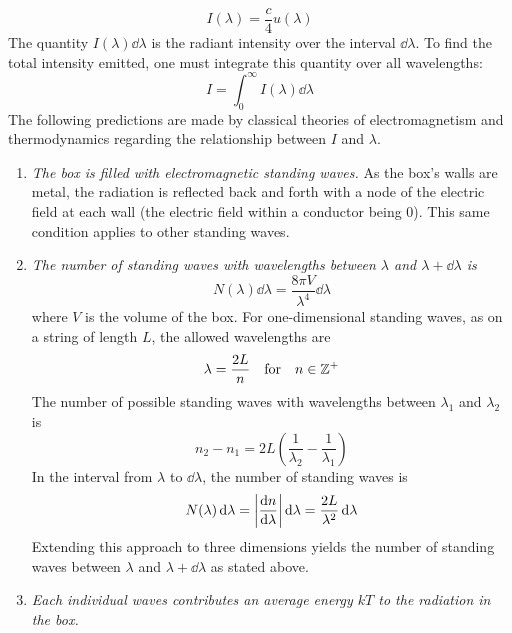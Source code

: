 \documentclass{subfiles}
\begin{document}
			\[I(\lambda) = \frac{c}{4}u(\lambda)\]
			The quantity \(I(\lambda)\dd{\lambda}\) is the radiant intensity over the interval \(\dd{\lambda}\). To find the total intensity emitted, one must integrate this quantity over all wavelengths:
				\[I = \int_0^\infty I(\lambda)\dd{\lambda}\]
			The following predictions are made by classical theories of electromagnetism and thermodynamics regarding the relationship between \(I\) and \(\lambda\).
			\begin{enumerate}
				\item \textit{The box is filled with electromagnetic standing waves.}
					As the box's walls are metal, the radiation is reflected back and forth with a node of the electric field at each wall (the electric field within a conductor being 0). This same condition applies to other standing waves.
				\item \textit{The number of standing waves with wavelengths between \(\lambda\) and \(\lambda + \dd{\lambda}\) is}
					\[N(\lambda)\dd{\lambda} = \frac{8\pi V}{\lambda^4}\dd{\lambda}\]
					where \(V\) is the volume of the box. For one-dimensional standing waves, as on a string of length \(L\), the allowed wavelengths are
					\[\lambda = \frac{2L}{n} \quad \text{for} \quad n \in \mathbb{Z}^+\]
					The number of possible standing waves with wavelengths between \(\lambda_1\) and \(\lambda_2\) is
					\[n_2 - n_1 = 2L\left(\frac{1}{\lambda_2} - \frac{1}{\lambda_1}\right)\]
					In the interval from \(\lambda\) to \(\dd{\lambda}\), the number of standing waves is
					\[
						N(\lambda)\dd{\lambda} = \left|\dv{n}{\lambda}\right|\dd{\lambda}
							= \frac{2L}{\lambda^2}\dd{\lambda}
					\]
					Extending this approach to three dimensions yields the number of standing waves between \(\lambda\) and \(\lambda + \dd{\lambda}\) as stated above.
				\item \textit{Each individual waves contributes an average energy \(kT\) to the radiation in the box.} 
			\end{enumerate}
\end{document}
